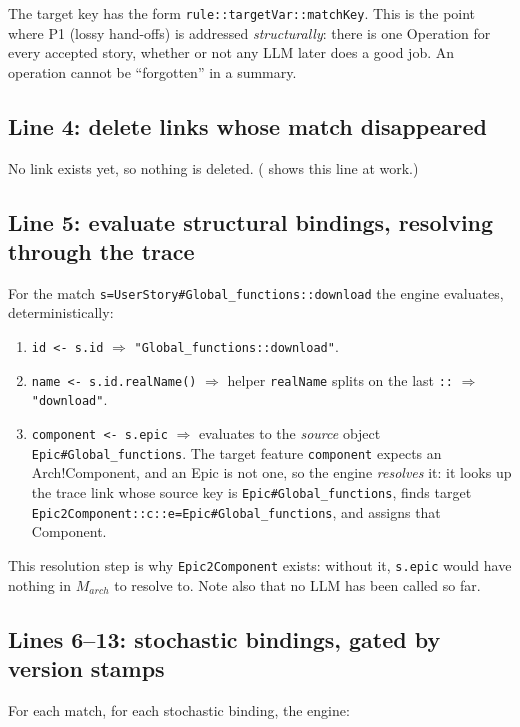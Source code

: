 \documentclass[10pt,a4paper]{article}
\newcommand{\cls}[1]{\textsf{#1}}
\newcommand{\code}[1]{\texttt{#1}}
\theoremstyle{definition}
\begin{document}
The target key has the form \code{rule::targetVar::matchKey}. This is the
point where P1 (lossy hand-offs) is addressed \emph{structurally}: there is
one \cls{Operation} for every accepted story, whether or not any LLM later
does a good job. An operation cannot be ``forgotten'' in a summary.

\subsection{Line 4: delete links whose match disappeared}

No link exists yet, so nothing is deleted. ( shows this
line at work.)

\subsection{Line 5: evaluate structural bindings, resolving through the trace}

For the match \code{s=UserStory\#Global_functions::download} the engine
evaluates, deterministically:

\begin{enumerate}[nosep]
\item \code{id <- s.id} $\Rightarrow$ \code{"Global_functions::download"}.
\item \code{name <- s.id.realName()} $\Rightarrow$ helper
\code{realName} splits on the last \code{::} $\Rightarrow$ \code{"download"}.
\item \code{component <- s.epic} $\Rightarrow$ evaluates to the \emph{source}
object \code{Epic\#Global_functions}. The target feature \code{component}
expects an \cls{Arch!Component}, and an \cls{Epic} is not one, so the engine
\emph{resolves} it: it looks up the trace link whose source key is
\code{Epic\#Global_functions}, finds target
\code{Epic2Component::c::e=Epic\#Global_functions}, and assigns that
\cls{Component}.
\end{enumerate}

This resolution step is why \code{Epic2Component} exists: without it,
\code{s.epic} would have nothing in $M_{\mathit{arch}}$ to resolve to. Note
also that no LLM has been called so far.

\subsection{Lines 6--13: stochastic bindings, gated by version stamps}

For each match, for each stochastic binding, the engine:
\end{document}
